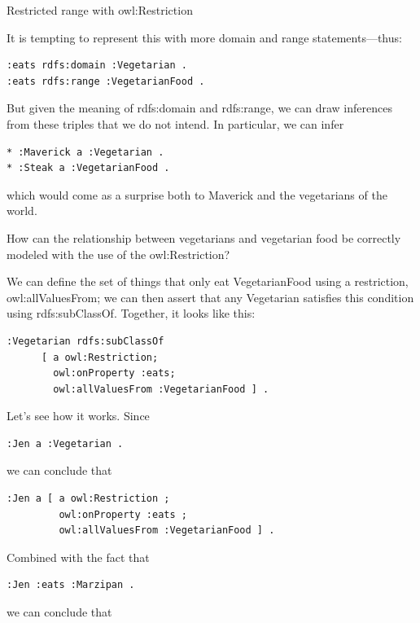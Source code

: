 \begin{challenge}{Restricted range with owl:Restriction}

It is tempting to represent this with more domain and range
statements---thus:

\begin{lstlisting}
:eats rdfs:domain :Vegetarian .
:eats rdfs:range :VegetarianFood .
\end{lstlisting}

But given the meaning of rdfs:domain and rdfs:range, we can draw
inferences from these triples that we do not intend. In particular, we
can infer

\begin{lstlisting}
* :Maverick a :Vegetarian .
* :Steak a :VegetarianFood .
\end{lstlisting}

which would come as a surprise both to Maverick and the vegetarians of
the world.

How can the relationship between vegetarians and vegetarian food be
correctly modeled with the use of the
owl:Restriction?

\solution

We can define the set of things that only eat VegetarianFood using a
restriction, owl:allValuesFrom; we can then assert that any Vegetarian
satisfies this condition using rdfs:subClassOf. Together, it looks like
this:

\begin{lstlisting}
:Vegetarian rdfs:subClassOf
      [ a owl:Restriction;
        owl:onProperty :eats;
        owl:allValuesFrom :VegetarianFood ] .
\end{lstlisting}

Let's see how it works. Since

\begin{lstlisting}
:Jen a :Vegetarian .
\end{lstlisting}

we can conclude that

\begin{lstlisting}
:Jen a [ a owl:Restriction ;
         owl:onProperty :eats ;
         owl:allValuesFrom :VegetarianFood ] .
\end{lstlisting}

Combined with the fact that

\begin{lstlisting}
:Jen :eats :Marzipan .
\end{lstlisting}

we can conclude that


\end{challenge}
